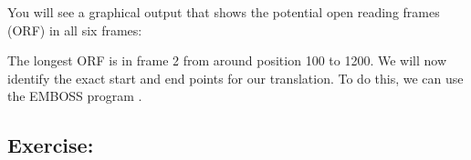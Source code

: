 \documentclass[12pt]{report}
\begin{document}
You will see a graphical output	that shows the potential open reading
frames (ORF) in	all six	frames:

\begin{figure}[H]
\begin{center}
\end{center}
\label{fig:plotorf}
\end{figure}

The longest ORF	is in frame 2 from around position 100 to 1200.	We
will now identify the exact start and end points for our
translation. To	do this, we can	use the	EMBOSS program
.

\subsection*{Exercise: }
\end{document}
